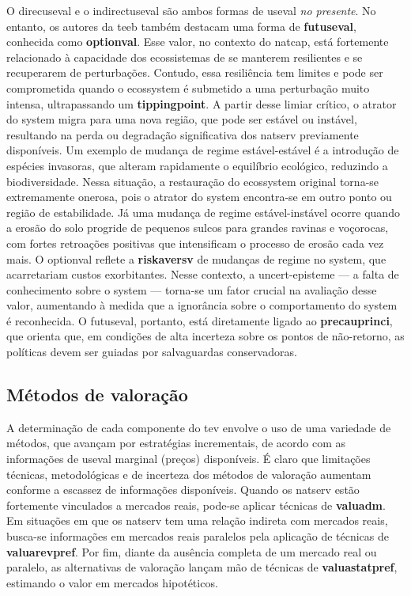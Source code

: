 \documentclass[./main.tex]{subfiles}
\begin{document}
\par O \gls{direcuseval} e o \gls{indirectuseval} são ambos formas de \gls{useval} \textit{no presente}. No entanto, os autores da \acrshort{teeb} também destacam uma forma de \textbf{\gls{futuseval}}, conhecida como \textbf{\gls{optionval}}. Esse valor, no contexto do \gls{natcap}, está fortemente relacionado à capacidade dos ecossistemas de se manterem resilientes e se recuperarem de perturbações. Contudo, essa resiliência tem limites e pode ser comprometida quando o ecos\gls{system} é submetido a uma perturbação muito intensa, ultrapassando um \textbf{\gls{tippingpoint}}. A partir desse limiar crítico, o atrator do \gls{system} migra para uma nova região, que pode ser estável ou instável, resultando na perda ou degradação significativa dos \gls{natserv} previamente disponíveis. Um exemplo de mudança de regime estável-estável é a introdução de espécies invasoras, que alteram rapidamente o equilíbrio ecológico, reduzindo a biodiversidade. Nessa situação, a restauração do ecos\gls{system} original torna-se extremamente onerosa, pois o atrator do \gls{system} encontra-se em outro ponto ou região de estabilidade. Já uma mudança de regime estável-instável ocorre quando a erosão do solo progride de pequenos sulcos para grandes ravinas e voçorocas, com fortes retroações positivas que intensificam o processo de erosão cada vez mais. O \gls{optionval} reflete a \textbf{\gls{riskaversv}} de mudanças de regime no \gls{system}, que acarretariam custos exorbitantes. Nesse contexto, a \gls{uncert-episteme} — a falta de conhecimento sobre o \gls{system} — torna-se um fator crucial na avaliação desse valor, aumentando à medida que a ignorância sobre o comportamento do \gls{system} é reconhecida. O \gls{futuseval}, portanto, está diretamente ligado ao \textbf{\gls{precauprinci}}, que orienta que, em condições de alta incerteza sobre os pontos de não-retorno, as políticas devem ser guiadas por salvaguardas conservadoras.

\subsection{Métodos de valoração}

\par A determinação de cada componente do \gls{tev} envolve o uso de uma variedade de métodos, que avançam por estratégias incrementais, de acordo com as informações de \gls{useval} marginal (preços) disponíveis. É claro que limitações técnicas, metodológicas e de incerteza dos métodos de valoração aumentam conforme a escassez de informações disponíveis. Quando os \gls{natserv} estão fortemente vinculados a mercados reais, pode-se aplicar técnicas de \textbf{\gls{valuadm}}. Em situações em que os \gls{natserv} tem uma relação indireta com mercados reais, busca-se informações em mercados reais paralelos pela aplicação de técnicas de \textbf{\gls{valuarevpref}}. Por fim, diante da ausência completa de um mercado real ou paralelo, as alternativas de valoração lançam mão de técnicas de \textbf{\gls{valuastatpref}}, estimando o valor em mercados hipotéticos.
\end{document}
